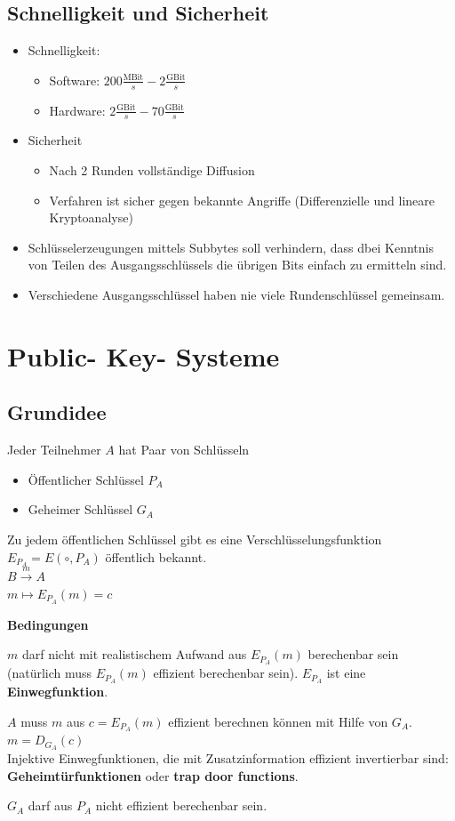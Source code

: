 	\subsection{Schnelligkeit und Sicherheit}
		\begin{itemize}
			\item Schnelligkeit:
			\begin{itemize}
				\item Software: $200\frac{\text{MBit}}{s}-2\frac{\text{GBit}}{s}$
				\item Hardware: $2\frac{\text{GBit}}{s}-70\frac{\text{GBit}}{s}$
			\end{itemize}
			\item Sicherheit
			\begin{itemize}
				\item Nach 2 Runden vollständige Diffusion
				\item Verfahren ist sicher gegen bekannte Angriffe (Differenzielle und lineare Kryptoanalyse)
			\end{itemize}
			\item Schlüsselerzeugungen mittels Subbytes soll verhindern, dass dbei Kenntnis von Teilen des Ausgangsschlüssels die übrigen Bits einfach zu ermitteln sind.
			\item Verschiedene Ausgangsschlüssel haben nie viele Rundenschlüssel gemeinsam.
		\end{itemize}
	
\section{Public- Key- Systeme}
	\subsection{Grundidee}
		Jeder Teilnehmer $A$ hat Paar von Schlüsseln
		\begin{itemize}
			\item Öffentlicher Schlüssel $P_A$
			\item Geheimer Schlüssel $G_A$
		\end{itemize}
		Zu jedem öffentlichen Schlüssel gibt es eine Verschlüsselungsfunktion	 $E_{P_A}=E(\circ, P_A)$ öffentlich bekannt.\\
		$B\overset{m}{\longrightarrow}A$\\
		$m\mapsto E_{P_A}(m)=c$
		
		\textbf{Bedingungen}
			\item $m$ darf nicht mit realistischem Aufwand aus $E_{P_A}(m)$ berechenbar sein (natürlich muss $E_{P_A}(m)$ effizient berechenbar sein). $E_{P_A}$ ist eine \textbf{Einwegfunktion}.
			\item $A$ muss $m$ aus $c=E_{P_A}(m)$ effizient berechnen können mit Hilfe von $G_A$. $m=D_{G_A}(c)$\\
			Injektive Einwegfunktionen, die mit Zusatzinformation effizient invertierbar sind: \textbf{Geheimtürfunktionen} oder \textbf{trap door functions}.
			\item $G_A$ darf aus $P_A$ nicht effizient berechenbar sein.
		\subExEnd
		
